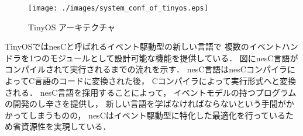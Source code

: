 \begin{figure}[htbp]
 \begin{center}
  \texttt{[image: ./images/system\_conf\_of\_tinyos.eps]}
 \end{center}
 \caption{TinyOS アーキテクチャ}
 \label{fig:system_conf_of_tinyos}
\end{figure}

TinyOSではnesC\cite{Gay:2003:NLH:781131.781133}と呼ばれるイベント駆動型の新しい言語で
複数のイベントハンドラを1つのモジュールとして設計可能な機能を提供している．
図にnesC言語がコンパイルされて実行されるまでの流れを示す．
nesC言語はnesCコンパイラによってC言語のコードに変換された後，
Cコンパイラによって実行形式へと変換される．
nesC言語を採用することによって，
イベントモデルの持つプログラムの開発のし辛さを提供し，
新しい言語を学ばなければならないという手間がかかってしまうものの，
nesCはイベント駆動型に特化した最適化を行っているため省資源性を実現している．






